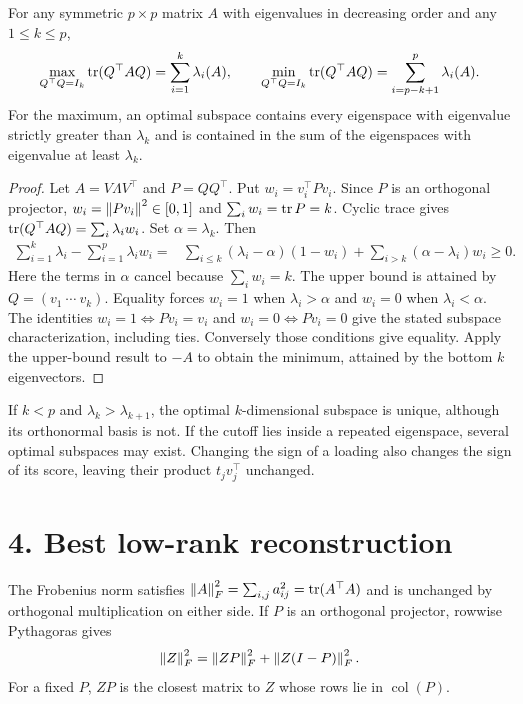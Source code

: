 \begin{theorem}\label{thm:12:trace}
For any symmetric $p\times p$ matrix $A$ with eigenvalues in decreasing
order and any $1\leqslant k\leqslant p$,
\[
\max_{Q^\top Q=I_k}\operatorname{tr}(Q^\top AQ)=\sum_{i=1}^k\lambda_i(A),\qquad
\min_{Q^\top Q=I_k}\operatorname{tr}(Q^\top AQ)=\sum_{i=p-k+1}^p\lambda_i(A).
\]
For the maximum, an optimal subspace contains every eigenspace with
eigenvalue strictly greater than $\lambda_k$ and is contained in the
sum of the eigenspaces with eigenvalue at least $\lambda_k$.
\end{theorem}
\begin{proof}
Let $A=V\Lambda V^\top$ and $P=QQ^\top$. Put $w_i=v_i^\top Pv_i$.
Since $P$ is an orthogonal projector, $w_i=\left\lVert Pv_i\right\rVert^2\in[0,1]$ and
$\sum_i w_i=\operatorname{tr} P=k$. Cyclic trace gives
$\operatorname{tr}(Q^\top AQ)=\sum_i\lambda_iw_i$.
Set $\alpha=\lambda_k$. Then
\[
\begin{split}
\sum_{i=1}^k\lambda_i-\sum_{i=1}^p\lambda_iw_i
={}&\sum_{i\leqslant k}(\lambda_i-\alpha)(1-w_i)
+\sum_{i>k}(\alpha-\lambda_i)w_i\geqslant0.
\end{split}
\]
Here the terms in $\alpha$ cancel because $\sum_iw_i=k$.
The upper bound is attained by $Q=(v_1\ \cdots\ v_k)$.
Equality forces $w_i=1$ when $\lambda_i>\alpha$ and $w_i=0$ when
$\lambda_i<\alpha$. The identities $w_i=1\iff Pv_i=v_i$ and
$w_i=0\iff Pv_i=0$ give the stated subspace characterization, including
ties. Conversely those conditions give equality.
Apply the upper-bound result to $-A$ to obtain the minimum, attained
by the bottom $k$ eigenvectors.
\end{proof}

If $k<p$ and $\lambda_k>\lambda_{k+1}$, the optimal $k$-dimensional
subspace is unique, although its orthonormal basis is not.
If the cutoff lies inside a repeated eigenspace, several optimal
subspaces may exist. Changing the sign of a loading also changes the
sign of its score, leaving their product $t_jv_j^\top$ unchanged.

\section*{4. Best low-rank reconstruction}
The Frobenius norm satisfies
$\left\lVert A\right\rVert_F^2=\sum_{i,j}a_{ij}^2=\operatorname{tr}(A^\top A)$ and is unchanged by
orthogonal multiplication on either side. If $P$ is an orthogonal
projector, rowwise Pythagoras gives
\[
\left\lVert Z\right\rVert_F^2=\left\lVert ZP\right\rVert_F^2+\left\lVert Z(I-P)\right\rVert_F^2.
\]
For a fixed $P$, $ZP$ is the closest matrix to $Z$ whose rows lie in
$\operatorname{col}(P)$.

